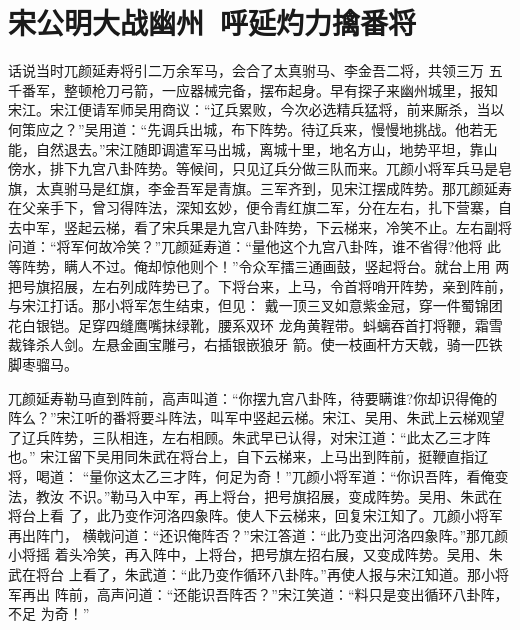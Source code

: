 \chapter{宋公明大战幽州~呼延灼力擒番将}

话说当时兀颜延寿将引二万余军马，会合了太真驸马、李金吾二将，共领三万
五千番军，整顿枪刀弓箭，一应器械完备，摆布起身。早有探子来幽州城里，报知
宋江。宋江便请军师吴用商议：“辽兵累败，今次必选精兵猛将，前来厮杀，当以
何策应之？”吴用道：“先调兵出城，布下阵势。待辽兵来，慢慢地挑战。他若无
能，自然退去。”宋江随即调遣军马出城，离城十里，地名方山，地势平坦，靠山
傍水，排下九宫八卦阵势。等候间，只见辽兵分做三队而来。兀颜小将军兵马是皂
旗，太真驸马是红旗，李金吾军是青旗。三军齐到，见宋江摆成阵势。那兀颜延寿
在父亲手下，曾习得阵法，深知玄妙，便令青红旗二军，分在左右，扎下营寨，自
去中军，竖起云梯，看了宋兵果是九宫八卦阵势，下云梯来，冷笑不止。左右副将
问道：“将军何故冷笑？”兀颜延寿道：“量他这个九宫八卦阵，谁不省得?他将
此等阵势，瞒人不过。俺却惊他则个！”令众军擂三通画鼓，竖起将台。就台上用
两把号旗招展，左右列成阵势已了。下将台来，上马，令首将哨开阵势，亲到阵前，
与宋江打话。那小将军怎生结束，但见：
戴一顶三叉如意紫金冠，穿一件蜀锦团花白银铠。足穿四缝鹰嘴抹绿靴，腰系双环
龙角黄鞓带。蚪螭吞首打将鞭，霜雪裁锋杀人剑。左悬金画宝雕弓，右插银嵌狼牙
箭。使一枝画杆方天戟，骑一匹铁脚枣骝马。

兀颜延寿勒马直到阵前，高声叫道：“你摆九宫八卦阵，待要瞒谁?你却识得俺的
阵么？”宋江听的番将要斗阵法，叫军中竖起云梯。宋江、吴用、朱武上云梯观望
了辽兵阵势，三队相连，左右相顾。朱武早已认得，对宋江道：“此太乙三才阵也。”
宋江留下吴用同朱武在将台上，自下云梯来，上马出到阵前，挺鞭直指辽将，喝道：
“量你这太乙三才阵，何足为奇！”兀颜小将军道：“你识吾阵，看俺变法，教汝
不识。”勒马入中军，再上将台，把号旗招展，变成阵势。吴用、朱武在将台上看
了，此乃变作河洛四象阵。使人下云梯来，回复宋江知了。兀颜小将军再出阵门，
横戟问道：“还识俺阵否？”宋江答道：“此乃变出河洛四象阵。”那兀颜小将摇
着头冷笑，再入阵中，上将台，把号旗左招右展，又变成阵势。吴用、朱武在将台
上看了，朱武道：“此乃变作循环八卦阵。”再使人报与宋江知道。那小将军再出
阵前，高声问道：“还能识吾阵否？”宋江笑道：“料只是变出循环八卦阵，不足
为奇！”

